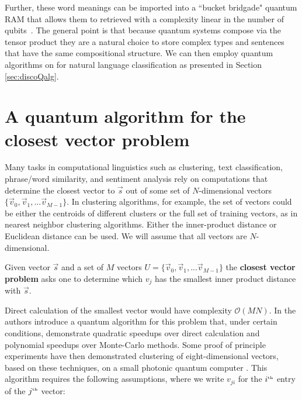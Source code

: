 Further, these word meanings can be imported into a ``bucket bridgade" quantum RAM that allows them to retrieved with a complexity linear in the number of qubits~\cite{giovannetti2008quantum}. The general point is that because quantum systems compose via the tensor product they are a natural choice to store complex types and sentences that have the same compositional structure. We can then employ quantum algorithms on for natural language classification as presented in Section \ref{sec:discoQalg}.

\section{A quantum algorithm for the closest vector problem}
\label{sec:qalg}

Many tasks in computational linguistics such as clustering, text classification, phrase/word similarity, and sentiment analysis rely on computations that determine the closest vector to $\vec{s}$ out of some set of $N$-dimensional vectors $\{\vec{v}_0,\vec{v}_1,...\vec{v}_{M-1}\}$. In clustering algorithms, for example, the set of vectors could be either the centroids of different clusters or the full set of training vectors, as in nearest neighbor clustering algorithms. Either the inner-product distance or Euclidean distance can be used. We will assume that all vectors are $N$-dimensional.
\begin{defn}
Given vector $\vec{s}$ and a set of $M$ vectors $U = \{\vec{v}_0,\vec{v}_1,...\vec{v}_{M-1}\}$ the \textbf{closest vector problem} asks one to determine which $v_j$ has the smallest inner product distance with $\vec{s}$.
\end{defn}
Direct calculation of the smallest vector would have complexity $\mathcal{O}(MN)$.  In \cite{wiebe2014quantum} the authors introduce a quantum algorithm for this problem that, under certain conditions, demonstrate quadratic speedups over direct calculation and polynomial speedups over Monte-Carlo methods. Some proof of principle experiments have then demonstrated clustering of eight-dimensional vectors, based on these techniques, on a small photonic quantum computer \cite{cai2015entanglement}. This algorithm requires the following assumptions, where we write $v_{ji}$ for the $i^{\tiny\mbox{th}}$ entry of the $j^{\tiny\mbox{th}}$ vector:
